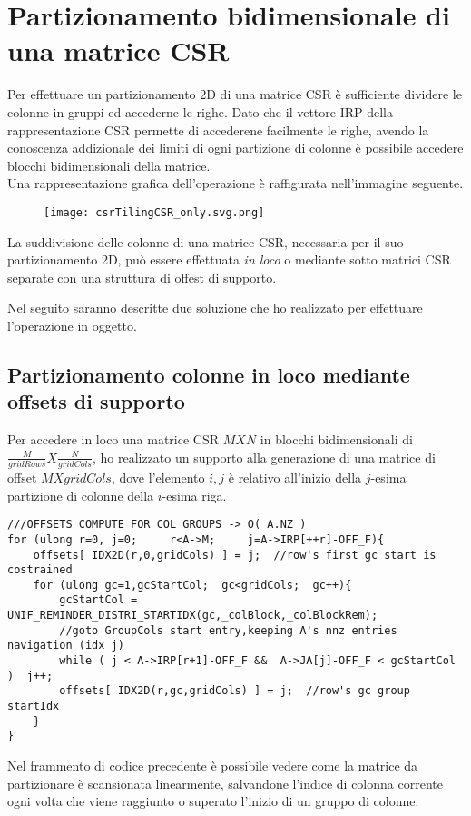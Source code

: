 \section{Partizionamento bidimensionale di una matrice CSR}	\label{chSpMMAux:CSR2DPARTI}
Per effettuare un partizionamento 2D di una matrice CSR è sufficiente
dividere le colonne in gruppi ed accederne le righe.
Dato che il vettore IRP della rappresentazione CSR permette di accederene facilmente le righe,
avendo la conoscenza addizionale dei limiti di ogni partizione di colonne è possibile accedere blocchi bidimensionali
della matrice.\\
Una rappresentazione grafica dell'operazione è raffigurata nell'immagine seguente.\\
\begin{figure}[h!]
  \centering \texttt{[image: csrTilingCSR\_only.svg.png]} 
  \caption[Rappresentazione grafica di un partizionamento 2D di una matrice CSR, \cite{adaptiveTilingSpMM}]
  \decoRule \label{fig:csrTilingCSR_only}
\end{figure}

La suddivisione delle colonne di una matrice CSR, necessaria per il suo partizionamento 2D, 
può essere effettuata \emph{in loco} o mediante sotto matrici CSR separate con una struttura di offest di supporto.

Nel seguito saranno descritte due soluzione che ho realizzato per effettuare l'operazione in oggetto.\\

\subsection{Partizionamento colonne in loco mediante offsets di supporto} 
\label{chSpMMAux:csrColPartitioning}
Per accedere in loco una matrice CSR $MXN$ in blocchi bidimensionali di $\frac{M}{gridRows}X\frac{N}{gridCols}$, 
ho realizzato un supporto alla generazione di una matrice di offset $MXgridCols$, dove l'elemento
$i,j$ è relativo all'inizio della $j$-esima partizione di colonne della $i$-esima riga.\\
\begin{lstlisting}
///OFFSETS COMPUTE FOR COL GROUPS -> O( A.NZ )
for (ulong r=0, j=0;     r<A->M;     j=A->IRP[++r]-OFF_F){
    offsets[ IDX2D(r,0,gridCols) ] = j;  //row's first gc start is costrained
    for (ulong gc=1,gcStartCol;  gc<gridCols;  gc++){
        gcStartCol = UNIF_REMINDER_DISTRI_STARTIDX(gc,_colBlock,_colBlockRem);
        //goto GroupCols start entry,keeping A's nnz entries navigation (idx j)
        while ( j < A->IRP[r+1]-OFF_F &&  A->JA[j]-OFF_F < gcStartCol )  j++;
        offsets[ IDX2D(r,gc,gridCols) ] = j;  //row's gc group startIdx
    }
}
\end{lstlisting}
Nel frammento di codice precedente è possibile vedere come la matrice da partizionare è scansionata
linearmente, salvandone l'indice di colonna corrente ogni volta che 
viene raggiunto o superato l'inizio di un gruppo di colonne.\\

